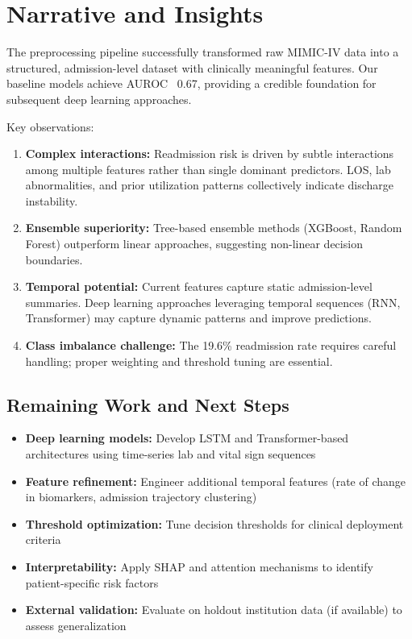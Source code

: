 \documentclass[runningheads]{llncs}
\begin{document}
\section{Narrative and Insights}

The preprocessing pipeline successfully transformed raw MIMIC-IV data into a structured, admission-level dataset with clinically meaningful features. Our baseline models achieve AUROC ~0.67, providing a credible foundation for subsequent deep learning approaches.

Key observations:
\begin{enumerate}
    \item \textbf{Complex interactions:} Readmission risk is driven by subtle interactions among multiple features rather than single dominant predictors. LOS, lab abnormalities, and prior utilization patterns collectively indicate discharge instability.
    \item \textbf{Ensemble superiority:} Tree-based ensemble methods (XGBoost, Random Forest) outperform linear approaches, suggesting non-linear decision boundaries.
    \item \textbf{Temporal potential:} Current features capture static admission-level summaries. Deep learning approaches leveraging temporal sequences (RNN, Transformer) may capture dynamic patterns and improve predictions.
    \item \textbf{Class imbalance challenge:} The 19.6\% readmission rate requires careful handling; proper weighting and threshold tuning are essential.
\end{enumerate}

\subsection{Remaining Work and Next Steps}

\begin{itemize}
    \item \textbf{Deep learning models:} Develop LSTM and Transformer-based architectures using time-series lab and vital sign sequences
    \item \textbf{Feature refinement:} Engineer additional temporal features (rate of change in biomarkers, admission trajectory clustering)
    \item \textbf{Threshold optimization:} Tune decision thresholds for clinical deployment criteria
    \item \textbf{Interpretability:} Apply SHAP and attention mechanisms to identify patient-specific risk factors
    \item \textbf{External validation:} Evaluate on holdout institution data (if available) to assess generalization
\end{itemize}
\end{document}
